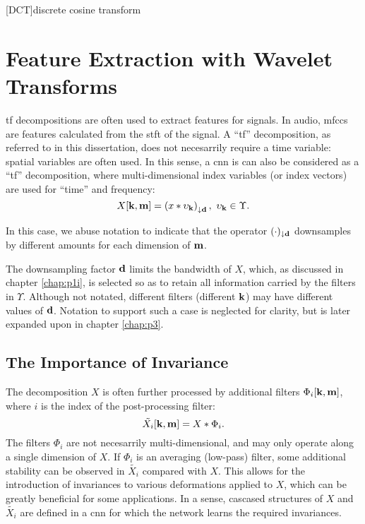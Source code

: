 [DCT]{discrete cosine transform}

\chapter{Feature Extraction with Wavelet Transforms}
\label{chap:p2i}

\ac{tf} decompositions are often used to extract features for signals. In audio, \acp{mfcc} are features calculated from the \ac{stft} of the signal. A ``\ac{tf}'' decomposition, as referred to in this dissertation, does not necesarrily require a time variable: spatial variables are often used. In this sense, a \ac{cnn} is can also be considered as a ``\ac{tf}'' decomposition, where multi-dimensional index variables (or index vectors) are used for ``time'' and frequency:
\begin{equation}
    X[\vect{k}, \vect{m}] = \left( x * \upsilon_{\vect{k}} \right)_{\downarrow \vect{d}}, \ \upsilon_{\vect{k}} \in \Upsilon.
\end{equation}

In this case, we abuse notation to indicate that the operator $(\cdot)_{\downarrow \boldsymbol{\mathbf{d}}}$ downsamples by different amounts for each dimension of $\boldsymbol{\mathbf{m}}$. 

The downsampling factor $\boldsymbol{\mathbf{d}}$ limits the bandwidth of $X$, which, as discussed in chapter \ref{chap:p1i}, is selected so as to retain all information carried by the filters in $\Upsilon$. Although not notated, different filters (different $\boldsymbol{\mathbf{k}}$) may have different values of $\boldsymbol{\mathbf{d}}$. Notation to support such a case is neglected for clarity, but is later expanded upon in chapter \ref{chap:p3}.

\section{The Importance of Invariance}

The decomposition $X$ is often further processed by additional filters $\Phi_i[\boldsymbol{\mathbf{k}}, \boldsymbol{\mathbf{m}}]$, where $i$ is the index of the post-processing filter:
\begin{equation}
    \tilde{X_i}[\boldsymbol{\mathbf{k}}, \boldsymbol{\mathbf{m}}] = X * \Phi_i.
\end{equation}
The filters $\Phi_i$ are not necesarrily multi-dimensional, and may only operate along a single dimension of $X$. If $\Phi_i$ is an averaging (low-pass) filter, some additional stability can be observed in $\tilde{X_i}$ compared with $X$. This allows for the introduction of invariances to various deformations applied to $X$, which can be greatly beneficial for some applications. In a sense, cascased structures of $X$ and $\tilde{X_i}$ are defined in a \ac{cnn} for which the network learns the required invariances.

